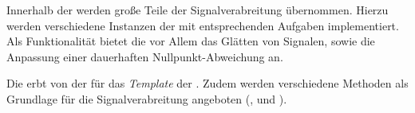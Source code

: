 
Innerhalb der  werden große Teile der Signalverabreitung übernommen. Hierzu werden verschiedene Instanzen der  mit entsprechenden Aufgaben implementiert. Als Funktionalität bietet die  vor Allem das Glätten von Signalen, sowie die Anpassung einer dauerhaften Nullpunkt-Abweichung an.


Die  erbt von der  für das \textit{Template} der .
Zudem werden verschiedene Methoden als Grundlage für die Signalverabreitung angeboten (,   und ).

